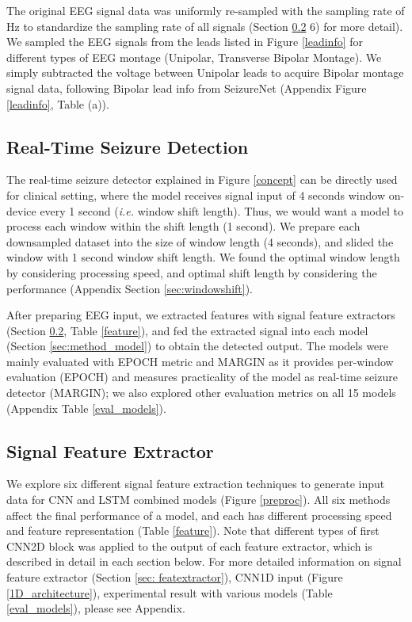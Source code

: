 \documentclass[pmlr,twocolumn,10pt]{jmlr}
\begin{document}
The original EEG signal data was uniformly re-sampled with the sampling rate of  Hz to standardize the sampling rate of all signals (Section \ref{sec:method_featext} 6) for more detail). We sampled the EEG signals from the leads listed in Figure \ref{leadinfo} for different types of EEG montage (Unipolar, Transverse Bipolar Montage). We simply subtracted the voltage between Unipolar leads to acquire Bipolar montage signal data, following Bipolar lead info from SeizureNet \citep{asif2020seizurenet} (Appendix Figure \ref{leadinfo}, Table (a)).

\subsection{Real-Time Seizure Detection}


The real-time seizure detector explained in Figure \ref{concept} can be directly used for clinical setting, where the model receives signal input of 4 seconds window on-device every 1 second (\textit{i.e.} window shift length). Thus, we would want a model to process each window within the shift length (1 second). We prepare each downsampled dataset into the size of window length (4 seconds), and slided the window with 1 second window shift length. We found the optimal window length by considering processing speed, and optimal shift length by considering the performance (Appendix Section \ref{sec:windowshift}).

After preparing EEG input, we extracted features with signal feature extractors (Section \ref{sec:method_featext}, Table \ref{feature}), and fed the extracted signal into each model (Section \ref{sec:method_model}) to obtain the detected output. 
The models were mainly evaluated with EPOCH metric and MARGIN as it provides per-window evaluation (EPOCH) and measures practicality of the model as real-time seizure detector (MARGIN); we also explored other evaluation metrics on all 15 models (Appendix Table \ref{eval_models}).

\subsection{Signal Feature Extractor}
\label{sec:method_featext}
We explore six different signal feature extraction techniques to generate input data for CNN and LSTM combined models (Figure \ref{preproc}). All six methods affect the final performance of a model, and each has different processing speed and feature representation (Table \ref{feature}).
Note that different types of first CNN2D block was applied to the output of each feature extractor, which is described in detail in each section below. For more detailed information on signal feature extractor (Section \ref{sec: featextractor}), CNN1D input (Figure \ref{1D_architecture}), experimental result with various models (Table \ref{eval_models}), please see Appendix.
\end{document}
